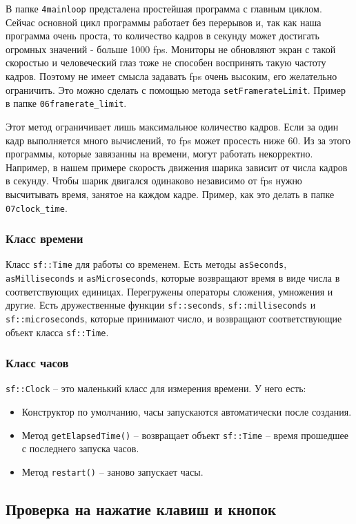 \documentclass{article}
\begin{document}
В папке \texttt{4mainloop} предсталена простейшая программа с главным циклом. Сейчас основной цикл программы работает без перерывов и, так как наша программа очень проста, то количество кадров в секунду может достигать огромных значений - больше 1000 fps. Мониторы не обновляют экран с такой скоростью и человеческий глаз тоже не способен воспринять такую частоту кадров. Поэтому не имеет смысла задавать fps очень высоким, его желательно ограничить. Это можно сделать с помощью метода \texttt{setFramerateLimit}. Пример в папке \texttt{06framerate\_limit}.

Этот метод ограничивает лишь максимальное количество кадров. Если за один кадр выполняется много вычислений, то fps может просесть ниже 60. Из за этого программы, которые завязанны на времени, могут работать некорректно. Например, в нашем примере скорость движения шарика зависит от числа кадров в секунду. Чтобы шарик двигался одинаково независимо от fps нужно высчитывать время, занятое на каждом кадре. Пример, как это делать в папке \texttt{07clock\_time}.

\subsubsection*{Класс времени}
Класс \texttt{sf::Time} для работы со временем. Есть методы \texttt{asSeconds}, \texttt{asMilliseconds} и \texttt{asMicroseconds}, которые возвращают время в виде числа в соответствующих единицах. Перегружены операторы сложения, умножения и другие. Есть дружественные функции \texttt{sf::seconds}, \texttt{sf::milliseconds} и \texttt{sf::microseconds}, которые принимают число, и возвращают соответствующие объект класса \texttt{sf::Time}.

\subsubsection*{Класс часов}
\texttt{sf::Clock} -- это маленький класс для измерения времени. У него есть:
\begin{itemize}
\item Конструктор по умолчанию, часы запускаются автоматически после создания.
\item Метод \texttt{getElapsedTime()} -- возвращает объект \texttt{sf::Time} -- время прошедшее с последнего запуска часов.
\item Метод \texttt{restart()} -- заново запускает часы.
\end{itemize}

\subsection*{Проверка на нажатие клавиш и кнопок}
\end{document}
